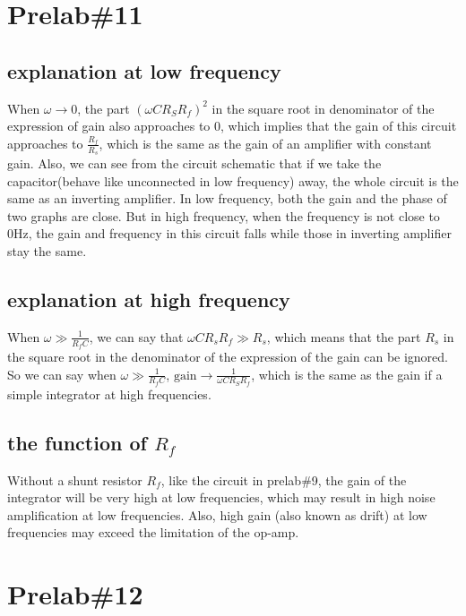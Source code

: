 \documentclass{IEEEtran}
\begin{document}
	\section{\textbf{Prelab\#11}}
	\subsection{explanation at low frequency}
	\phantom{ } When $ \omega \to 0 $, the part $ (\omega C R_S R_f)^2 $ in the square root in denominator of the expression of gain also approaches to 0, which implies that the gain of this circuit approaches to $ \frac{R_f}{R_s} $, which is the same as the gain of an amplifier with constant gain. Also, we can see from the circuit schematic that if we take the capacitor(behave like unconnected in low frequency) away, the whole circuit is the same as an inverting amplifier. In low frequency, both the gain and the phase of two graphs are close. But in high frequency, when the frequency is not close to $ 0\si{\hertz} $, the gain and frequency in this circuit falls while those in inverting amplifier stay the same. 
	\subsection{explanation at high frequency}
	\phantom{ } When $ \omega \gg \frac{1}{R_fC} $, we can say that $ \omega CR_sR_f \gg R_s $, which means that the part $ R_s $ in the square root in the denominator of the expression of the gain can be ignored. So we can say when $ \omega \gg \frac{1}{R_fC} $, $ \mathrm{gain} \to \frac{1}{\omega CR_SR_f} $, which is the same as the gain if a simple integrator at high frequencies.
	\subsection{the function of $ R_f $}
	\phantom{ } Without a shunt resistor $ R_f $, like the circuit in prelab\#9, the gain of the integrator will be very high at low frequencies, which may result in high noise amplification at low frequencies. Also, high gain (also known as drift) at low frequencies may exceed the limitation of the op-amp.
	\section{\textbf{Prelab\#12}}
\end{document}
